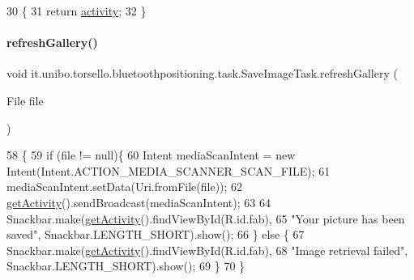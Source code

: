 \begin{DoxyCode}
30                                            \{
31         \textcolor{keywordflow}{return} \hyperlink{classit_1_1unibo_1_1torsello_1_1bluetoothpositioning_1_1task_1_1SaveImageTask_a340aca6a2cdcfbf41aed236588669203_a340aca6a2cdcfbf41aed236588669203}{activity};
32     \}
\end{DoxyCode}
\hypertarget{classit_1_1unibo_1_1torsello_1_1bluetoothpositioning_1_1task_1_1SaveImageTask_a813b3e0d75f59558de551aa6251e3d08_a813b3e0d75f59558de551aa6251e3d08}{}\label{classit_1_1unibo_1_1torsello_1_1bluetoothpositioning_1_1task_1_1SaveImageTask_a813b3e0d75f59558de551aa6251e3d08_a813b3e0d75f59558de551aa6251e3d08} 
\paragraph{\texorpdfstring{refresh\+Gallery()}{refreshGallery()}}
{\footnotesize\ttfamily void it.\+unibo.\+torsello.\+bluetoothpositioning.\+task.\+Save\+Image\+Task.\+refresh\+Gallery (\begin{DoxyParamCaption}\item[{File}]{file }\end{DoxyParamCaption})\hspace{0.3cm}{\ttfamily [private]}}


\begin{DoxyCode}
58                                            \{
59         \textcolor{keywordflow}{if} (file != null)\{
60             Intent mediaScanIntent = \textcolor{keyword}{new} Intent(Intent.ACTION\_MEDIA\_SCANNER\_SCAN\_FILE);
61             mediaScanIntent.setData(Uri.fromFile(file));
62             \hyperlink{classit_1_1unibo_1_1torsello_1_1bluetoothpositioning_1_1task_1_1SaveImageTask_a6fda270f42937b64e3767644e7dd63a5_a6fda270f42937b64e3767644e7dd63a5}{getActivity}().sendBroadcast(mediaScanIntent);
63 
64             Snackbar.make(\hyperlink{classit_1_1unibo_1_1torsello_1_1bluetoothpositioning_1_1task_1_1SaveImageTask_a6fda270f42937b64e3767644e7dd63a5_a6fda270f42937b64e3767644e7dd63a5}{getActivity}().findViewById(R.id.fab),
65                     \textcolor{stringliteral}{"Your picture has been saved"}, Snackbar.LENGTH\_SHORT).show();
66         \} \textcolor{keywordflow}{else} \{
67             Snackbar.make(\hyperlink{classit_1_1unibo_1_1torsello_1_1bluetoothpositioning_1_1task_1_1SaveImageTask_a6fda270f42937b64e3767644e7dd63a5_a6fda270f42937b64e3767644e7dd63a5}{getActivity}().findViewById(R.id.fab),
68                         \textcolor{stringliteral}{"Image retrieval failed"}, Snackbar.LENGTH\_SHORT).show();
69         \}
70     \}
\end{DoxyCode}


